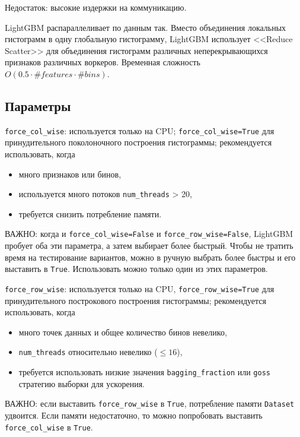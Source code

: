 \documentclass[%
	11pt,
	a4paper,
	utf8,
		]{article}
\begin{document}
Недостаток: высокие издержки на коммуникацию.
\vspace{3mm}

LightGBM распараллеливает по данным так. Вместо объединения локальных гистограмм в одну глобальную гистограмму, LightGBM использует <<Reduce Scatter>> для объединения гистограмм различных неперекрывающихся признаков различных воркеров. Временная сложность $ O(0.5 \cdot \#features \cdot \#bins) $.

\subsection{Параметры}

\verb|force_col_wise|: используется только на CPU; \verb|force_col_wise=True| для принудительного поколоночного построения гистограммы; рекомендуется использовать, когда 
\begin{itemize}
	\item много признаков или бинов,
	
	\item используется много потоков \verb|num_threads| > 20,
	
	\item требуется снизить потребление памяти.
\end{itemize}

ВАЖНО: когда и \verb|force_col_wise=False| и \verb|force_row_wise=False|, LightGBM пробует оба эти параметра, а затем выбирает более быстрый. Чтобы не тратить время на тестирование вариантов, можно в ручную выбрать более быстры и его выставить в \verb|True|. Использовать можно только один из этих параметров.

\verb|force_row_wise|: используется только на CPU, \verb|force_row_wise=True| для принудительного построкового построения гистограммы; рекомендуется использовать, когда
\begin{itemize}
	\item много точек данных и общее количество бинов невелико,
	
	\item \verb|num_threads| относительно невелико ($ \leqslant 16 $),
	
	\item требуется использовать низкие значения \verb|bagging_fraction| или \verb|goss| стратегию выборки для ускорения.
\end{itemize}

ВАЖНО: если выставить \verb|force_row_wise| в \verb|True|, потребление памяти \verb|Dataset| удвоится. Если памяти недостаточно, то можно попробовать выставить \verb|force_col_wise| в \verb|True|.
\end{document}
